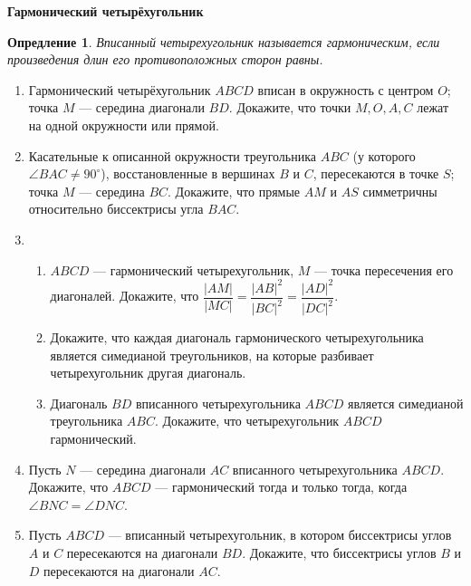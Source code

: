 \documentclass{article}
\newtheorem{definition}{Опредление}
\begin{document}
\large



\begin{center}
\textbf{Гармонический четырёхугольник}
\end{center}

\begin{definition}
	Вписанный четырехугольник называется гармоническим, если произведения длин
	его противоположных сторон равны.
\end{definition}

\begin{enumerate}[label*=\protect\fbox{\arabic{enumi}}]

\item Гармонический четырёхугольник $ABCD$ вписан в окружность с центром $O$; точка $M$ — середина диагонали $BD$. Докажите, что точки $M, O, A, C$ лежат на одной
окружности или прямой.

\item Касательные к описанной окружности треугольника $ABC$ (у которого $\angle BAC \neq 90^\circ$),
восстановленные в вершинах $B$ и $C$, пересекаются в точке $S$; точка $M$ — середина $BC$.
Докажите, что прямые $AM$ и $AS$ симметричны относительно биссектрисы угла $BAC$.

\item  
\begin{enumerate} 
	\item $ABCD$ — гармонический четырехугольник, $M$ — точка пересечения его диагоналей.
Докажите, что
$\dfrac{|AM|}{|MC|}=\dfrac{|AB|^2}{|BC|^2}=\dfrac{|AD|^2}{|DC|^2}.$
	\item Докажите, что каждая диагональ гармонического четырехугольника является симедианой
треугольников, на которые разбивает четырехугольник другая диагональ.
	\item Диагональ $BD$ вписанного четырехугольника $ABCD$ является симедианой треугольника
$ABC$. Докажите, что четырехугольник $ABCD$ гармонический.
\end{enumerate}

\item Пусть $N$ — середина диагонали $AC$ вписанного четырехугольника $ABCD$. Докажите, что
$ABCD$ — гармонический тогда и только тогда, когда $\angle BNC = \angle DNC$.

\item Пусть $ABCD$ — вписанный четырехугольник, в котором биссектрисы углов $A$ и $C$ пересекаются
на диагонали $BD$. Докажите, что биссектрисы углов $B$ и $D$ пересекаются на диагонали $AC$.


\end{enumerate}
\end{document}
